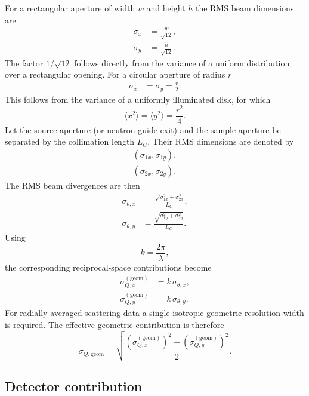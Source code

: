 For a rectangular aperture of width $w$ and height $h$ the RMS beam dimensions are 
\begin{align} \sigma_x &= \frac{w}{\sqrt{12}}, \\ \sigma_y &= \frac{h}{\sqrt{12}}. 
\end{align} 
The factor $1/\sqrt{12}$ follows directly from the variance of a uniform distribution over a rectangular opening. For a circular aperture of radius $r$ 
\begin{align} 
\sigma_x &= \sigma_y = \frac{r}{2}. 
\end{align} 
This follows from the variance of a uniformly illuminated disk, for which 
\begin{equation} 
\langle x^2 \rangle = \langle y^2 \rangle = \frac{r^2}{4}. 
\end{equation} 
Let the source aperture (or neutron guide exit) and the sample aperture be separated by the collimation length $L_C$. Their RMS dimensions are denoted by 
\begin{align} 
(\sigma_{1x},\sigma_{1y}),\\ (\sigma_{2x},\sigma_{2y}). 
\end{align} 
The RMS beam divergences are then 
\begin{align} 
\sigma_{\theta,x} &= \frac{ \sqrt{\sigma_{1x}^2+\sigma_{2x}^2} }{L_C}, \\ 
\sigma_{\theta,y} &= \frac{ \sqrt{\sigma_{1y}^2+\sigma_{2y}^2} }{L_C}. 
\end{align} 
Using 
\begin{equation} 
k=\frac{2\pi}{\lambda}, 
\end{equation} 
the corresponding reciprocal-space contributions become 
\begin{align} 
\sigma_{Q,x}^{(\mathrm{geom})} &= k\,\sigma_{\theta,x}, \\ 
\sigma_{Q,y}^{(\mathrm{geom})} &= k\,\sigma_{\theta,y}. 
\end{align} 
For radially averaged scattering data a single isotropic geometric resolution width is required. The effective geometric contribution is therefore 
\begin{equation} 
\sigma_{Q,\mathrm{geom}} = \sqrt{ \frac{ \left( \sigma_{Q,x}^{(\mathrm{geom})} \right)^2 + \left( \sigma_{Q,y}^{(\mathrm{geom})} \right)^2 }{2} }. 
\end{equation} 

\subsection{Detector contribution} 

